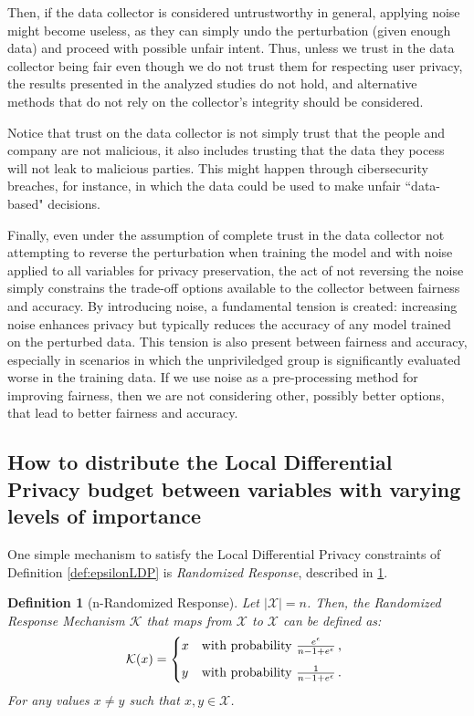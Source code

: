 \documentclass[conference]{IEEEtran}
\newtheorem{definition}{Definition}
\newcommand{\qm}[1]{``#1"}
\begin{document}
Then, if the data collector is considered untrustworthy in general, applying noise might become useless, as they can simply undo the perturbation (given enough data) and proceed with possible unfair intent. Thus, unless we trust in the data collector being fair even though we do not trust them for respecting user privacy, the results presented in the analyzed studies do not hold, and alternative methods that do not rely on the collector's integrity should be considered.

Notice that trust on the data collector is not simply trust that the people and company are not malicious, it also includes trusting that the data they pocess will not leak to malicious parties. This might happen through cibersecurity breaches, for instance, in which the data could be used to make unfair \qm{data-based} decisions.

Finally, even under the assumption of complete trust in the data collector not attempting to reverse the perturbation when training the model and with noise applied to all variables for privacy preservation, the act of not reversing the noise simply constrains the trade-off options available to the collector between fairness and accuracy. By introducing noise, a fundamental tension is created: increasing noise enhances privacy but typically reduces the accuracy of any model trained on the perturbed data\cite{ren2018textsf}. This tension is also present between fairness and accuracy, especially in scenarios in which the unpriviledged group is significantly evaluated worse in the training data\cite{Carlos}. If we use noise as a pre-processing method for improving fairness, then we are not considering other, possibly better options, that lead to better fairness and accuracy\cite{Reductions}\cite{konstantinov2022impossibility}. 

\subsection{How to distribute the Local Differential Privacy budget between variables with varying levels of importance}\label{subsec:ldpbudget}

One simple mechanism to satisfy the Local Differential Privacy constraints of Definition \ref{def:epsilonLDP} is \emph{Randomized Response}, described in \ref{def:nrr}.

\begin{definition}[n-Randomized Response]\label{def:nrr} Let $|\mathcal{X}| = n$. Then, the Randomized Response Mechanism $\mathcal{K}$ that maps from $\mathcal{X}$ to $\mathcal{X}$ can be defined as:
	\[
	\mathcal{K}(x) = 
	\begin{dcases*}
		x
		& with probability $\frac{e^\epsilon}{n-1+e^\epsilon}$\,, \\[1ex]
		y 
	   	& with probability $\frac{1}{n-1+e^\epsilon}$\,.
	\end{dcases*}
	\]
For any values $x\neq y$ such that $x,y\in\mathcal{X}$.
\end{definition}
\end{document}

